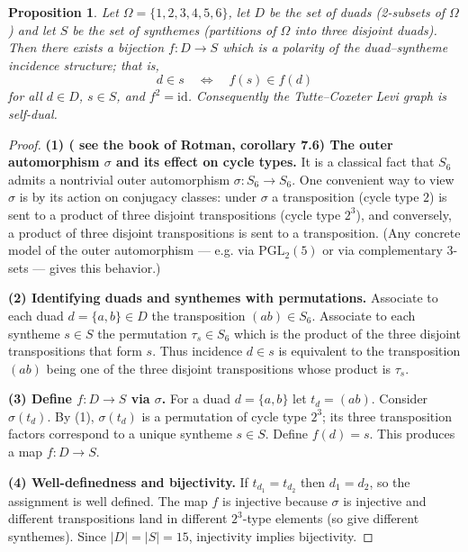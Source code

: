 \documentclass[12pt,a4paper,openany]{book}
\newtheorem{proposition}{Proposition}[section]
\begin{document}
\medskip
\begin{proposition}
Let \(\Omega=\{1,2,3,4,5,6\}\), let \(D\) be the set of duads (2-subsets of \(\Omega\)) and let \(S\) be the set of synthemes (partitions of \(\Omega\) into three disjoint duads).  
Then there exists a bijection \(f\!:D\to S\) which is a polarity of the duad–syntheme incidence structure; that is,
\[
d\in s \quad\Longleftrightarrow\quad f(s)\in f(d)
\]
for all \(d\in D\), \(s\in S\), and \(f^2=\mathrm{id}\). Consequently the Tutte--Coxeter Levi graph is self-dual.
\end{proposition}
\begin{proof}
\textbf{(1) ( see the book of Rotman, corollary 7.6) The outer automorphism \(\sigma\) and its effect on cycle types.}  
It is a classical fact that \(S_6\) admits a nontrivial outer automorphism
\(\sigma:S_6\to S_6\). One convenient way to view \(\sigma\) is by its action on conjugacy classes: under \(\sigma\) a transposition (cycle type \(2\)) is sent to a product of three disjoint transpositions (cycle type \(2^3\)), and conversely, a product of three disjoint transpositions is sent to a transposition. (Any concrete model of the outer automorphism — e.g. via \( \mathrm{PGL}_2(5)\) or via complementary 3-sets — gives this behavior.)

\medskip
\textbf{(2) Identifying duads and synthemes with permutations.}  
Associate to each duad \(d=\{a,b\}\in D\) the transposition \((ab)\in S_6\).  
Associate to each syntheme \(s\in S\) the permutation \(\tau_s\in S_6\) which is the product of the three disjoint transpositions that form \(s\). Thus incidence \(d\in s\) is equivalent to the transposition \((ab)\) being one of the three disjoint transpositions whose product is \(\tau_s\).

\medskip
\textbf{(3) Define \(f\colon D\to S\) via \(\sigma\).}  
For a duad \(d=\{a,b\}\) let \(t_d=(ab)\). Consider \(\sigma(t_d)\). By (1), \(\sigma(t_d)\) is a permutation of cycle type \(2^3\); its three transposition factors correspond to a unique syntheme \(s\in S\). Define \(f(d)=s\). This produces a map \(f\colon D\to S\).

\medskip
\textbf{(4) Well-definedness and bijectivity.}  
If \(t_{d_1}=t_{d_2}\) then \(d_1=d_2\), so the assignment is well defined. The map \(f\) is injective because \(\sigma\) is injective and different transpositions land in different \(2^3\)-type elements (so give different synthemes). Since \(|D|=|S|=15\), injectivity implies bijectivity.


\end{proof}
\end{document}
